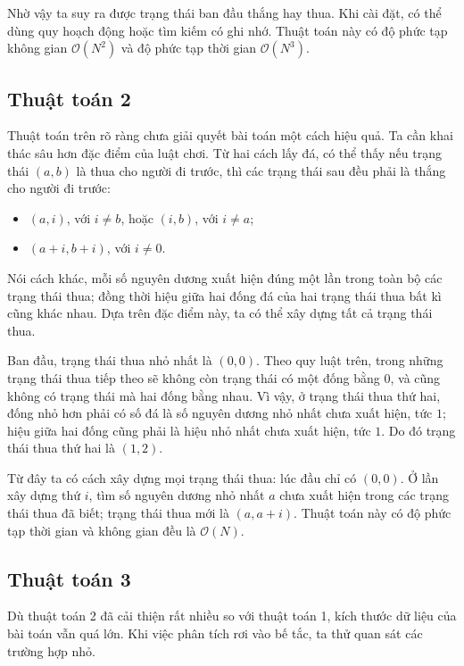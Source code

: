 \documentclass[11pt]{article}
\newcommand{\Oh}{\mathcal{O}}
\begin{document}
Nhờ vậy ta suy ra được trạng thái ban đầu thắng hay thua. Khi cài đặt, có thể
dùng quy hoạch động hoặc tìm kiếm có ghi nhớ. Thuật toán này có độ phức tạp
không gian \(\Oh(N^2)\) và độ phức tạp thời gian \(\Oh(N^3)\).

\subsection{Thuật toán 2}

Thuật toán trên rõ ràng chưa giải quyết bài toán một cách hiệu quả. Ta cần
khai thác sâu hơn đặc điểm của luật chơi. Từ hai cách lấy đá, có thể thấy nếu
trạng thái \((a,b)\) là thua cho người đi trước, thì các trạng thái sau đều
phải là thắng cho người đi trước:
\begin{itemize}
  \item \((a,i)\), với \(i\ne b\), hoặc \((i,b)\), với \(i\ne a\);
  \item \((a+i,b+i)\), với \(i\ne 0\).
\end{itemize}

Nói cách khác, mỗi số nguyên dương xuất hiện đúng một lần trong toàn bộ các
trạng thái thua; đồng thời hiệu giữa hai đống đá của hai trạng thái thua bất
kì cũng khác nhau. Dựa trên đặc điểm này, ta có thể xây dựng tất cả trạng
thái thua.

Ban đầu, trạng thái thua nhỏ nhất là \((0,0)\). Theo quy luật trên, trong
những trạng thái thua tiếp theo sẽ không còn trạng thái có một đống bằng
\(0\), và cũng không có trạng thái mà hai đống bằng nhau. Vì vậy, ở trạng thái
thua thứ hai, đống nhỏ hơn phải có số đá là số nguyên dương nhỏ nhất chưa
xuất hiện, tức \(1\); hiệu giữa hai đống cũng phải là hiệu nhỏ nhất chưa xuất
hiện, tức \(1\). Do đó trạng thái thua thứ hai là \((1,2)\).

Từ đây ta có cách xây dựng mọi trạng thái thua: lúc đầu chỉ có \((0,0)\). Ở
lần xây dựng thứ \(i\), tìm số nguyên dương nhỏ nhất \(a\) chưa xuất hiện
trong các trạng thái thua đã biết; trạng thái thua mới là \((a,a+i)\). Thuật
toán này có độ phức tạp thời gian và không gian đều là \(\Oh(N)\).

\subsection{Thuật toán 3}

Dù thuật toán 2 đã cải thiện rất nhiều so với thuật toán 1, kích thước dữ
liệu của bài toán vẫn quá lớn. Khi việc phân tích rơi vào bế tắc, ta thử
quan sát các trường hợp nhỏ.
\end{document}
